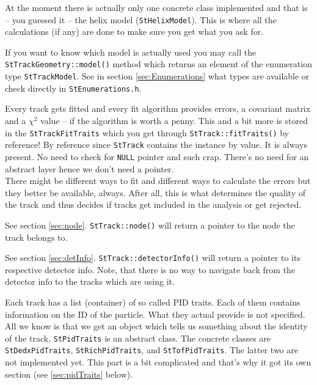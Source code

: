 \documentclass[twoside]{article}
\begin{document}
\begin{description}
    At the moment there is actually only one concrete class
    implemented and that is -- you guessed it -- the helix model
    (\texttt{StHelixModel}). This is where all the calculations (if
    any) are done to make sure you get what you ask for.
    
    If you want to know which model is actually used you may call the
    \texttt{StTrackGeometry::model()} method which returns an element
    of the enumeration type \texttt{StTrackModel}. See in section
    \ref{sec:Enumerations} what types are available or check directly
    in \texttt{StEnumerations.h}.
    
\item[StTrackFitTraits]  Every track gets
    fitted and every fit algorithm provides errors, a covariant matrix
    and a $\chi^2$ value -- if the algorithm is worth a penny.  This
    and a bit more is stored in the \texttt{StTrackFitTraits} which
    you get through \texttt{StTrack::fitTraits()} by reference! By
    reference since \texttt{StTrack} contains the instance by value.
    It is always present. No need to check for \texttt{NULL} pointer
    and such crap. There's no need for an abstract
    layer hence we don't need a pointer.\\
    There might be different ways to fit and different ways to
    calculate the errors but they better be available, always. After
    all, this is what determines the quality of the track and thus
    decides if tracks get included in the analysis or get rejected.
    
\item[StTrackNode]  See section \ref{sec:node}.
    \texttt{StTrack::node()} will return a pointer to the node the
    track belongs to.
    
\item[StDetectorInfo]  See section
    \ref{sec:detInfo}.  \texttt{StTrack::detectorInfo()} will return a
    pointer to its respective detector info. Note, that there is no
    way to navigate back from the detector info to the tracks which
    are using it.
    
\item[StPidTraits]  Each track has a list
    (container) of so called PID traits. Each of them contains
    information on the ID of the particle. What they actual provide is
    not specified. All we know is that we get an object which tells us
    something about the identity of the track.  \texttt{StPidTraits}
    is an abstract class. The concrete classes are
    \texttt{StDedxPidTraits}, \texttt{StRichPidTraits}, and
    \texttt{StTofPidTraits}. The latter two are not implemented yet.
    This part is a bit complicated and that's why it got its own
    section (see \ref{sec:pidTraits} below).
    

\end{description}
\end{document}
